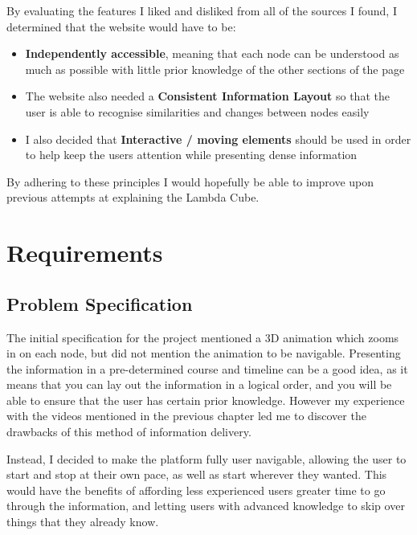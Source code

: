 \documentclass{l4proj}
\begin{document}
By evaluating the features I liked and disliked from all of the sources I found, I determined that the website would have to be:

\begin{itemize}
    \item \textbf{Independently accessible}, meaning that each node can be understood as much as possible with little prior knowledge of the other sections of the page

    \item The website also needed a \textbf{Consistent Information Layout} so that the user is able to recognise similarities and changes between nodes easily

    \item I also decided that \textbf{Interactive / moving elements} should be used in order to help keep the users attention while presenting dense information
\end{itemize}

By adhering to these principles I would hopefully be able to improve upon previous attempts at explaining the Lambda Cube.
\chapter{Requirements}

\section{Problem Specification}
The initial specification for the project mentioned a 3D animation which zooms in on each node, but did not mention the animation to be navigable.  Presenting the information in a pre-determined course and timeline can be a good idea, as it means that you can lay out the information in a logical order, and you will be able to ensure that the user has certain prior knowledge.  However my experience with the videos mentioned in the previous chapter led me to discover the drawbacks of this method of information delivery.

Instead, I decided to make the platform fully user navigable, allowing the user to start and stop at their own pace, as well as start wherever they wanted.  This would have the benefits of affording less experienced users greater time to go through the information, and letting users with advanced knowledge to skip over things that they already know.
\end{document}
